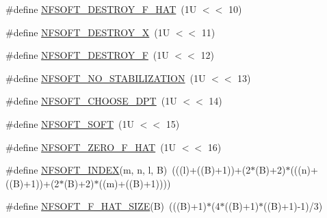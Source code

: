 \begin{DoxyCompactItemize}
\item 
\#define \hyperlink{group__nfsoft_gad324d67114a4f52a9fc86d2639745acd}{N\-F\-S\-O\-F\-T\-\_\-\-D\-E\-S\-T\-R\-O\-Y\-\_\-\-F\-\_\-\-H\-A\-T}~(1\-U $<$$<$ 10)
\item 
\#define \hyperlink{group__nfsoft_gab7ca87a4bb214bcc25d544aa0b6dd503}{N\-F\-S\-O\-F\-T\-\_\-\-D\-E\-S\-T\-R\-O\-Y\-\_\-\-X}~(1\-U $<$$<$ 11)
\item 
\#define \hyperlink{group__nfsoft_ga93ab283dcb14d5b37b130e2556bb6e7d}{N\-F\-S\-O\-F\-T\-\_\-\-D\-E\-S\-T\-R\-O\-Y\-\_\-\-F}~(1\-U $<$$<$ 12)
\item 
\#define \hyperlink{group__nfsoft_gae6c22599d21b5d8a8f144a39b49d3677}{N\-F\-S\-O\-F\-T\-\_\-\-N\-O\-\_\-\-S\-T\-A\-B\-I\-L\-I\-Z\-A\-T\-I\-O\-N}~(1\-U $<$$<$ 13)
\item 
\#define \hyperlink{group__nfsoft_ga43ce16ed2d1893df2b997e637ccde4d4}{N\-F\-S\-O\-F\-T\-\_\-\-C\-H\-O\-O\-S\-E\-\_\-\-D\-P\-T}~(1\-U $<$$<$ 14)
\item 
\#define \hyperlink{group__nfsoft_ga07ad8a429e8451bd153563eedc3ef0bf}{N\-F\-S\-O\-F\-T\-\_\-\-S\-O\-F\-T}~(1\-U $<$$<$ 15)
\item 
\#define \hyperlink{group__nfsoft_gadaa4a4436a6a9e8b491660bb5fc54f8e}{N\-F\-S\-O\-F\-T\-\_\-\-Z\-E\-R\-O\-\_\-\-F\-\_\-\-H\-A\-T}~(1\-U $<$$<$ 16)
\item 
\#define \hyperlink{group__nfsoft_ga796e2f298278bbed00bf0704b553be98}{N\-F\-S\-O\-F\-T\-\_\-\-I\-N\-D\-E\-X}(m, n, l, B)~(((l)+((B)+1))+(2$\ast$(B)+2)$\ast$(((n)+((B)+1))+(2$\ast$(B)+2)$\ast$((m)+((B)+1))))
\item 
\#define \hyperlink{group__nfsoft_gad214901ec9451e6076e05d22eb734d49}{N\-F\-S\-O\-F\-T\-\_\-\-F\-\_\-\-H\-A\-T\-\_\-\-S\-I\-Z\-E}(B)~(((B)+1)$\ast$(4$\ast$((B)+1)$\ast$((B)+1)-\/1)/3)
\end{DoxyCompactItemize}
